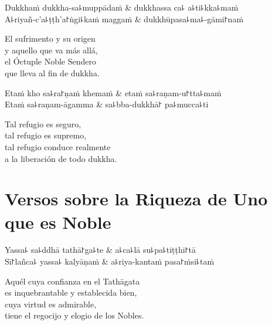 \begin{twochants}
  Dukkhaṁ dukkha-sa꜕muppādaṁ & dukkhassa ca꜕ a꜕ti꜕kka꜕maṁ \\
  A꜕riyañ-c'a꜕ṭṭh'a꜓ṅgi꜕kaṁ maggaṁ & dukkhūpasa꜕ma꜕-gāmi꜓naṁ \\
\end{twochants}

\begin{english}
  El sufrimento y su origen \\
  y aquello que va más allá,\\
  el Óctuple Noble Sendero\\
  que lleva al fin de dukkha.
\end{english}

\begin{twochants}
  Etaṁ kho sa꜕ra꜓ṇaṁ khemaṁ & etaṁ sa꜕raṇam-u꜓tta꜕maṁ \\
  Etaṁ sa꜕raṇam-āgamma & sa꜕bba-dukkhā꜓ pa꜕mucca꜕ti \\
\end{twochants}

\begin{english}
  Tal refugio es seguro,\\
  tal refugio es supremo,\\
  tal refugio conduce realmente\\
  a la liberación de todo dukkha.
\end{english}

\chapter{Versos sobre la Riqueza de Uno que es Noble}


\begin{leader}
\end{leader}

\begin{twochants}
  Yassa꜕ sa꜕ddhā tathā꜓ga꜕te & a꜕ca꜕lā su꜕pa꜕tiṭṭhi꜓tā \\
  Sī꜓lañca꜕ yassa꜕ kalyāṇaṁ & a꜕riya-kantaṁ pasa꜓ṁsi꜕taṁ \\
\end{twochants}

\begin{english}
  Aquél cuya confianza en el Tathāgata\\
  es inquebrantable y establecida bien,\\
  cuya virtud es admirable,\\
  tiene el regocijo y elogio de los Nobles.
\end{english}

